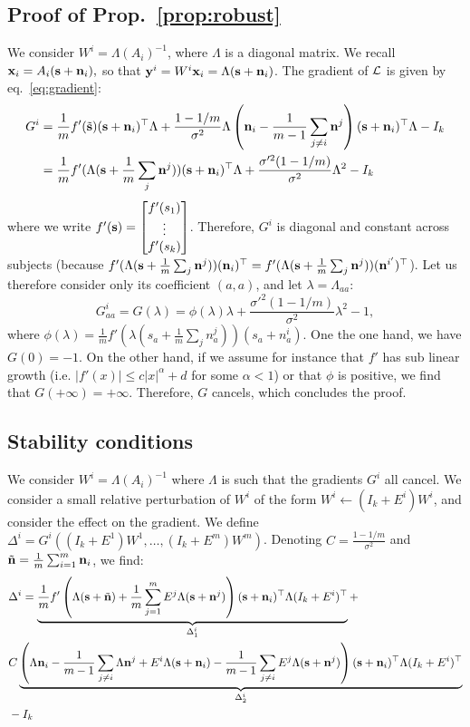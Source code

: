 \documentclass[12pt]{report}
\begin{document}
\subsection{Proof of Prop.~\ref{prop:robust}}
\label{ref:robust}
We consider $W^i = \Lambda (A_i)^{-1}$, where $\Lambda$ is a diagonal matrix.
%
We recall $\mathbf{x}_i= A_i (\mathbf{s} + \mathbf{n}_i),$ so that $\mathbf{y}^i = W^i\mathbf{x}_i= \Lambda(\mathbf{s} + \mathbf{n}_i)$.
%
The gradient of $\mathcal{L}$ is given by eq.~\eqref{eq:gradient}:
\begin{align}
  G^i &= \frac{1}{m}f'(\tilde{\mathbf{s}})(\mathbf{s} + \mathbf{n}_i)^{\top}\Lambda + \frac{1 - 1/m}{\sigma^2} \Lambda\left(\mathbf{n}_i - \frac{1}{m-1}\sum_{j\neq i} \mathbf{n}^j\right)(\mathbf{s} + \mathbf{n}_i)^{\top}\Lambda - I_k \\
  & = \frac{1}{m}f'(\Lambda(\mathbf{s} + \frac1m\sum_j\mathbf{n}^j))(\mathbf{s}+\mathbf{n}_i)^{\top} \Lambda + \frac{\sigma'^2(1 - 1/m)}{\sigma^2} \Lambda^2 - I_k
\end{align}
where we write $f'(\mathbf{s}) = \begin{bmatrix}f'(s_1) \\ \vdots \\ f'(s_k) \end{bmatrix}$.
Therefore, $G^i$ is diagonal and constant across subjects (because $f'(\Lambda(\mathbf{s} + \frac1m\sum_j\mathbf{n}^j))(\mathbf{n}_i)^{\top} = f'(\Lambda(\mathbf{s} + \frac1m\sum_j\mathbf{n}^j))(\mathbf{n}^{i'})^{\top}$).
Let us therefore consider only its coefficient $(a, a)$, and let $\lambda = \Lambda_{aa}$:
$$
G^i_{aa} =G(\lambda) = \phi(\lambda)\lambda + \frac{\sigma'^2(1 - 1/m)}{\sigma^2}\lambda^2 - 1,
$$
where $\phi(\lambda) = \frac{1}{m}f'(\lambda(s_a + \frac1m\sum_j n^j_a))(s_a+n_a^i)$. One the one hand, we have $G(0) = -1$. On the other hand, if we assume for instance that $f'$ has sub linear growth (i.e. $|f'(x)| \leq c|x|^{\alpha} +d$ for some $\alpha < 1$) or that $\phi$ is positive, we find that $G(+\infty) = +\infty$.
Therefore, $G$ cancels, which concludes the proof.

\subsection{Stability conditions}
\label{sec:stability}
We consider $W^i = \Lambda (A_i)^{-1}$ where $\Lambda$ is such that the gradients $G^i$ all cancel. We consider a small relative perturbation of $W^i $ of the form $W^i \leftarrow (I_k + E^i)W^i$, and consider the effect on the gradient.
We define $\Delta^i=G^i\left((I_k + E^1)W^1, \dots, (I_k + E^m)W^m\right)$.
Denoting $C = \frac{1 - 1/ m}{\sigma^2}$ and $\tilde{\mathbf{n}} = \frac1m\sum_{i=1}^m \mathbf{n}_i$, we find:
\begin{align}
     &\Delta^i=\underbrace{\frac1m f'\left(\Lambda(\mathbf{s} + \tilde{\mathbf{n}}) + \frac1m \sum_{j=1}^m E^j\Lambda(\mathbf{s} +\mathbf{n}^j)\right)(\mathbf{s} +\mathbf{n}_i)^{\top}\Lambda(I_k + E^i)^{\top} }_{\Delta_1^i} +\\
     &C\underbrace{\left(\Lambda\mathbf{n}_i - \frac{1}{m-1}\sum_{j\neq i} \Lambda\mathbf{n}^j + E^i\Lambda(\mathbf{s} + \mathbf{n}_i) - \frac{1}{m-1}\sum_{j\neq i} E^j \Lambda(\mathbf{s} + \mathbf{n}^j)\right)(\mathbf{s} + \mathbf{n}_i)^{\top}\Lambda(I_k + E^i)^{\top}}_{\Delta_2^i} \\
     &- I_k\\
\end{align}
\end{document}
